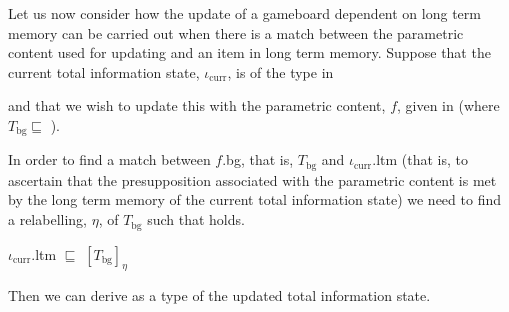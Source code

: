 Let us now consider how the update of a gameboard dependent on long
term memory can be carried out when there is a match between the
parametric content used for updating and an item in long term memory.
Suppose that the current total information state, $\iota_{\mathrm{curr}}$, is of the type in \nexteg{}
\begin{ex} 
\end{ex} 
and that we wish to update this with the parametric content, $f$, given in \nexteg{} (where
$T_{\mathrm{bg}}\sqsubseteq$ ).
\begin{ex}
\end{ex} 
In order to find a match between $f$.bg, that is, $T_{\mathrm{bg}}$ and $\iota_{\mathrm{curr}}$.ltm
(that is, to ascertain that the presupposition associated with the
parametric content is met by the long term memory of the current total
information state) we need to find a relabelling, $\eta$, of $T_{\mathrm{bg}}$ such that
\nexteg{} holds.
\begin{ex} 
$\iota_{\mathrm{curr}}$.ltm $\sqsubseteq$ $[T_{\mathrm{bg}}]_\eta$ 
\end{ex} 
Then we can derive \nexteg{} as a type of the updated total
information state.
\begin{ex} 

 
\end{ex}

